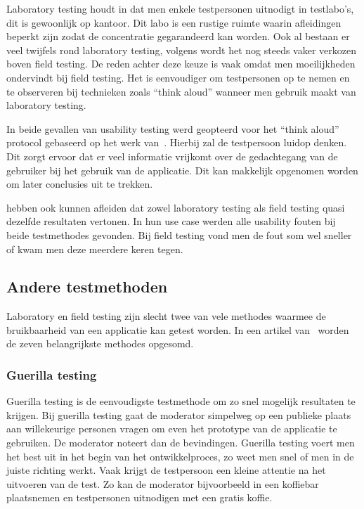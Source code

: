 Laboratory testing houdt in dat men enkele testpersonen uitnodigt in testlabo's, dit is gewoonlijk op kantoor. Dit labo is een rustige ruimte waarin afleidingen beperkt zijn zodat de concentratie gegarandeerd kan worden. Ook al bestaan er veel twijfels rond laboratory testing, volgens \textcite{Kjeldskov2003} wordt het nog steeds vaker verkozen boven field testing. De reden achter deze keuze is vaak omdat men moeilijkheden ondervindt bij field testing. Het is eenvoudiger om testpersonen op te nemen en te observeren bij technieken zoals ``think aloud'' wanneer men gebruik maakt van laboratory testing.

In beide gevallen van usability testing werd geopteerd voor het ``think aloud'' protocol gebaseerd op het werk van~\textcite{Ericsson1984}. Hierbij zal de testpersoon luidop denken. Dit zorgt ervoor dat er veel informatie vrijkomt over de gedachtegang van de gebruiker bij het gebruik van de applicatie. Dit kan makkelijk opgenomen worden om later conclusies uit te trekken.

\textcite{Kaikkonen2005} hebben ook kunnen afleiden dat zowel laboratory testing als field testing quasi dezelfde resultaten vertonen. In hun use case werden alle usability fouten bij beide testmethodes gevonden. Bij field testing vond men de fout som wel sneller of kwam men deze meerdere keren tegen.

\subsection{Andere testmethoden}
\label{sec:usability-testing:testmethoden}

Laboratory en field testing zijn slecht twee van vele methodes waarmee de bruikbaarheid van een applicatie kan getest worden. In een artikel van~\textcite{Babich2019} worden de zeven belangrijkste methodes opgesomd.

\subsubsection{Guerilla testing}
\label{sec:usability-testing:testmethoden:guerilla}

Guerilla testing is de eenvoudigste testmethode om zo snel mogelijk resultaten te krijgen. Bij guerilla testing gaat de moderator simpelweg op een publieke plaats aan willekeurige personen vragen om even het prototype van de applicatie te gebruiken. De moderator noteert dan de bevindingen. Guerilla testing voert men het best uit in het begin van het ontwikkelproces, zo weet men snel of men in de juiste richting werkt. Vaak krijgt de testpersoon een kleine attentie na het uitvoeren van de test. Zo kan de moderator bijvoorbeeld in een koffiebar plaatsnemen en testpersonen uitnodigen met een gratis koffie.

